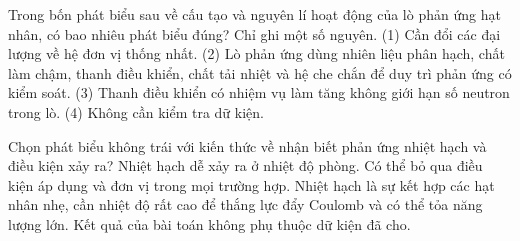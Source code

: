 \begin{ex}
Trong bốn phát biểu sau về cấu tạo và nguyên lí hoạt động của lò phản ứng hạt nhân, có bao nhiêu phát biểu đúng? Chỉ ghi một số nguyên. (1) Cần đổi các đại lượng về hệ đơn vị thống nhất. (2) Lò phản ứng dùng nhiên liệu phân hạch, chất làm chậm, thanh điều khiển, chất tải nhiệt và hệ che chắn để duy trì phản ứng có kiểm soát. (3) Thanh điều khiển có nhiệm vụ làm tăng không giới hạn số neutron trong lò. (4) Không cần kiểm tra dữ kiện.
\end{ex}

\begin{ex}
Chọn phát biểu không trái với kiến thức về nhận biết phản ứng nhiệt hạch và điều kiện xảy ra?
\choice
{Nhiệt hạch dễ xảy ra ở nhiệt độ phòng.}
{Có thể bỏ qua điều kiện áp dụng và đơn vị trong mọi trường hợp.}
{\True Nhiệt hạch là sự kết hợp các hạt nhân nhẹ, cần nhiệt độ rất cao để thắng lực đẩy Coulomb và có thể tỏa năng lượng lớn.}
{Kết quả của bài toán không phụ thuộc dữ kiện đã cho.}
\end{ex}

